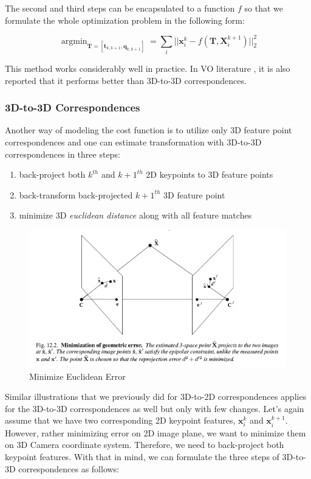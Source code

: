 \documentclass[a4paper]{report}
\numberwithin{figure}{section}
\newcommand{\argmin}{\mathop{\mathrm{argmin}}}
\begin{document}
The second and third steps can be encapsulated to a function $f$ so that 
we formulate the whole optimization problem in the following form:

\begin{equation}
  \argmin_{\mathbf{T} = [\mathbf{t}_{k,k+1}, \mathbf{q}_{k,k+1}]} = 
  \sum_i||\mathbf{x}_i^k - f(\mathbf{T}, \mathbf{X}_i^{k+1})||^2_2
\end{equation}

This method works considerably well in practice. In VO literature \cite{}, 
it is also reported that it performs better than 3D-to-3D correspondences.

\subsubsection{3D-to-3D Correspondences}

Another way of modeling the cost function is to utilize only 3D feature point 
correspondences and one can estimate transformation with 3D-to-3D correspondences in three steps:

\begin{enumerate}
  \item back-project both $k^{th}$ and $k+1^{th}$ 2D keypoints to 3D feature points
  \item back-transform back-projected $k+1^{th}$ 3D feature point
  \item minimize 3D \textit{euclidean distance} along with all feature matches
\end{enumerate}

\begin{figure}[H]
	\centering
  \includegraphics[width=0.7\linewidth,natwidth=640,natheight=640]
  {fig/ref_imgs/min_euclidean_error.png}
  \caption{Minimize Euclidean Error}
	\label{fig:min_euclidean_error}
\end{figure}


Similar illustrations that we previously did for 3D-to-2D correspondences applies 
for the 3D-to-3D correspondences as well but only with few changes. 
Let's again assume that we have two corresponding 2D keypoint features,
$\mathbf{x}_i^k$ and $\mathbf{x}_i^{k+1}$. However, rather minimizing error on 
2D image plane, we want to minimize them on 3D Camera coordinate system. Therefore, 
we need to back-project both keypoint features. With that in mind, 
we can formulate the three steps of 3D-to-3D correspondences as follows:
\end{document}
